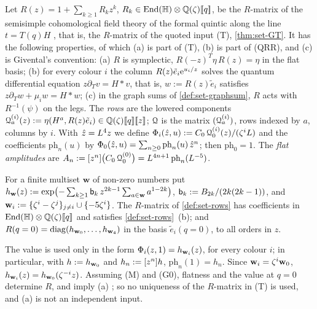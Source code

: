 \begin{defn}
\label{def:set-rows}
Let $R(z)=1+\sum_{k\geq1}R_kz^k$, $R_k\in\operatorname{End}(\mathbb{H})\otimes\mathbb{Q}(\zeta)[\![ q ]\!]$, be the $R$-matrix of the semisimple cohomological field theory of the formal quintic along the line $t=T(q)H$ \cite[\S4.1]{GJR18}, that is, the $R$-matrix of the quoted input (T), \cref{thm:set-GT}. It has the following properties, of which (a) is part of (T), (b) is part of (QRR), and (c) is Givental's convention: (a) $R$ is symplectic, $R(-z)^T\eta\,R(z)=\eta$ in the flat basis; (b) for every colour $i$ the column $R(z)\tilde e_i\mathrm{e}^{u_i/z}$ solves the quantum differential equation $z\partial_Tv=H*v$, that is, $w:=R(z)\tilde e_i$ satisfies $z\partial_Tw+\mu_iw=H*w$; (c) in the graph sums of \cref{def:set-graphsum}, $R$ acts with $R^{-1}(\psi)$ on the legs. The \emph{rows} are the lowered components $\mathcal{Q}^{(i)}_a(z):=\eta(H^a,R(z)\tilde e_i)\in\mathbb{Q}(\zeta)[\![ q ]\!][\![ z ]\!]$; $\mathcal{Q}$ is the matrix $(\mathcal{Q}^{(i)}_a)$, rows indexed by $a$, columns by $i$. With $\hat{z}=L^4z$ we define $\Phi_i(\hat{z},u):=C_0\,\mathcal{Q}^{(i)}_0(z)/(\zeta^iL)$ and the coefficients $\mathrm{ph}_n(u)$ by $\Phi_0(\hat{z},u)=\sum_{n\geq0}\mathrm{ph}_n(u)\,\hat{z}^n$; then $\mathrm{ph}_0=1$. The \emph{flat amplitudes} are $A_n:=[z^n]\bigl(C_0\,\mathcal{Q}^{(0)}_0\bigr)=L^{4n+1}\,\mathrm{ph}_n(L^{-5})$.
\end{defn}

\begin{thm}[Flatness of the $R$-matrix and its value at $q=0$, (QRR); quoted; {\Lr{thm:set-qrr}}]
\label{thm:set-qrr}
For a finite multiset $\mathbf w$ of non-zero numbers put $h_{\mathbf{w}}(z):=\exp\bigl(-\sum_{k\geq1}\mathsf{b}_k\,z^{2k-1}\sum_{a\in\mathbf w}a^{1-2k}\bigr)$, $\mathsf{b}_k:=B_{2k}/(2k(2k-1))$, and $\mathbf{w}_i:=\{\zeta^i-\zeta^j\}_{j\neq i}\cup\{-5\zeta^i\}$. The $R$-matrix of \cref{def:set-rows} has coefficients in $\operatorname{End}(\mathbb{H})\otimes\mathbb{Q}(\zeta)[\![ q ]\!]$ and satisfies \cref{def:set-rows}~(b); and $R(q=0)=\operatorname{diag}(h_{\mathbf{w}_0},\dots,h_{\mathbf{w}_4})$ in the basis $\tilde e_i(q=0)$, to all orders in $z$.
\end{thm}

The value is used only in the form $\Phi_i(z,1)=h_{\mathbf{w}_i}(z)$, for every colour $i$; in particular, with $h:=h_{\mathbf{w}_0}$ and $h_n:=[z^n]h$, $\mathrm{ph}_n(1)=h_n$. Since $\mathbf{w}_i=\zeta^i\mathbf{w}_0$, $h_{\mathbf{w}_i}(z)=h_{\mathbf{w}_0}(\zeta^{-i}z)$. Assuming (M) and (G0), flatness and the value at $q=0$ determine $R$, and imply (a) ; so no uniqueness of the $R$-matrix in (T) is used, and (a) is not an independent input.


